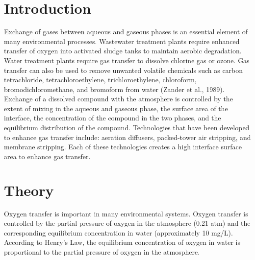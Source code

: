 \documentclass[letterpaper,10pt,english]{sphinxmanual}
\begin{document}
\section{Introduction}
\label{\detokenize{Gas_Transfer/Gas_Transfer:introduction}}\label{\detokenize{Gas_Transfer/Gas_Transfer:heading-gas-transfer-introduction}}
Exchange of gases between aqueous and gaseous phases is an essential element of many environmental processes. Wastewater treatment plants require enhanced transfer of oxygen into activated sludge tanks to maintain aerobic degradation. Water treatment plants require gas transfer to dissolve chlorine gas or ozone. Gas transfer can also be used to remove unwanted volatile chemicals such as carbon tetrachloride, tetrachloroethylene, trichloroethylene, chloroform, bromodichloromethane, and bromoform from water (Zander et al., 1989). Exchange of a dissolved compound with the atmosphere is controlled by the extent of mixing in the aqueous and gaseous phase, the surface area of the interface, the concentration of the compound in the two phases, and the equilibrium distribution of the compound. Technologies that have been developed to enhance gas transfer include: aeration diffusers, packed-tower air stripping, and membrane stripping. Each of these technologies creates a high interface surface area to enhance gas transfer.


\section{Theory}
\label{\detokenize{Gas_Transfer/Gas_Transfer:theory}}\label{\detokenize{Gas_Transfer/Gas_Transfer:heading-gas-transfer-theory}}
Oxygen transfer is important in many environmental systems. Oxygen transfer is controlled by the partial pressure of oxygen in the atmosphere (0.21 atm) and the corresponding equilibrium concentration in water (approximately 10 mg/L). According to Henry’s Law, the equilibrium concentration of oxygen in water is proportional to the partial pressure of oxygen in the atmosphere.
\end{document}
